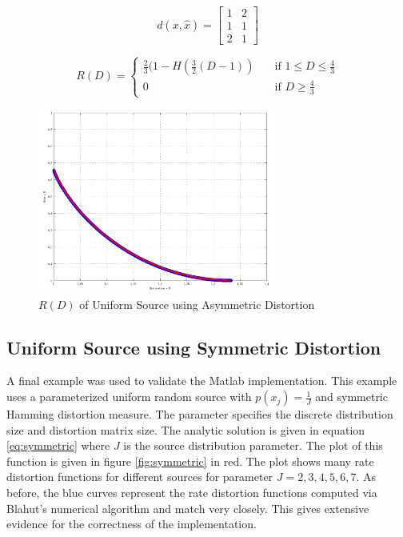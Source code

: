 \documentclass[journal]{IEEEtran}
\begin{document}
\begin{equation}
\label{eq:asymmetric}
d(x,\hat{x}) = 
\begin{bmatrix}
1 & 2\\
1 & 1\\
2 & 1
\end{bmatrix}
\end{equation}

\begin{equation}
\label{eq:asymmetricRate}
R(D) = 
  \begin{cases}
    \frac{2}{3}(1-H(\frac{3}{2}(D-1)) & \quad \text{if } 1\leq D\leq \frac{4}{3} \\
    0 & \quad \text{if } D \geq \frac{4}{3}
  \end{cases}
\end{equation}

\begin{figure}[!h]
\centering
\includegraphics[width=3.1in]{../images/asymmetric.png}
\caption{\(R(D)\) of Uniform Source using Asymmetric Distortion}
\label{fig:asymmetric}
\end{figure}

\subsection{Uniform Source using Symmetric Distortion}
\par A final example was used to validate the Matlab implementation. This example uses a parameterized uniform random source with \(p(x_j)=\frac{1}{J}\) and symmetric Hamming distortion measure. The parameter specifies the discrete distribution size and distortion matrix size. The analytic solution is given in equation \ref{eq:symmetric} where \(J\) is the source distribution parameter. The plot of this function is given in figure \ref{fig:symmetric} in red. The plot shows many rate distortion functions for different sources for parameter \(J={2,3,4,5,6,7}\). As before, the blue curves represent the rate distortion functions computed via Blahut's numerical algorithm and match very closely. This gives extensive evidence for the correctness of the implementation.
\end{document}
